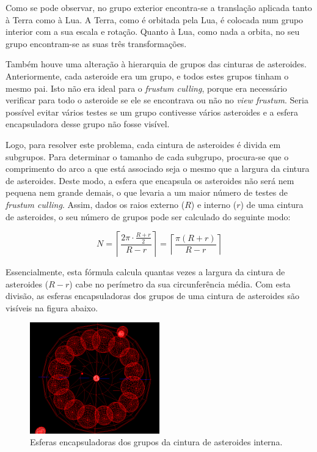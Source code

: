 \documentclass[12pt, a4paper]{article}
\begin{document}
Como se pode observar, no grupo exterior encontra-se a translação aplicada tanto à Terra como à Lua.
A Terra, como é orbitada pela Lua, é colocada num grupo interior com a sua escala e rotação. Quanto
à Lua, como nada a orbita, no seu grupo encontram-se as suas três transformações.

Também houve uma alteração à hierarquia de grupos das cinturas de asteroides. Anteriormente, cada
asteroide era um grupo, e todos estes grupos tinham o mesmo pai. Isto não era ideal para o
\emph{frustum culling}, porque era necessário verificar para todo o asteroide se ele se encontrava
ou não no \emph{view frustum}. Seria possível evitar vários testes se um grupo contivesse vários
asteroides e a esfera encapsuladora desse grupo não fosse visível.

Logo, para resolver este problema, cada cintura de asteroides é divida em subgrupos. Para determinar
o tamanho de cada subgrupo, procura-se que o comprimento do arco a que está associado seja o mesmo
que a largura da cintura de asteroides. Deste modo, a esfera que encapsula os asteroides não será
nem pequena nem grande demais, o que levaria a um maior número de testes de \emph{frustum culling}.
Assim, dados os raios externo ($R$) e interno ($r$) de uma cintura de asteroides, o seu número de
grupos pode ser calculado do seguinte modo:

$$
N = \left \lceil \frac{2 \pi \cdot \frac{R + r}{2}}{R - r} \right \rceil
  = \left \lceil \frac{\pi (R + r)}{R - r} \right \rceil
$$

Essencialmente, esta fórmula calcula quantas vezes a largura da cintura de asteroides ($R - r$) cabe
no perímetro da sua circunferência média. Com esta divisão, as esferas encapsuladoras dos grupos de
uma cintura de asteroides são visíveis na figura abaixo.

\begin{figure}[H]
    \centering
    \includegraphics[width=0.5\textwidth]{res/phase3/AsteroidBeltBoundingSpheres.png}
    \caption{Esferas encapsuladoras dos grupos da cintura de asteroides interna.}
\end{figure}
\end{document}
